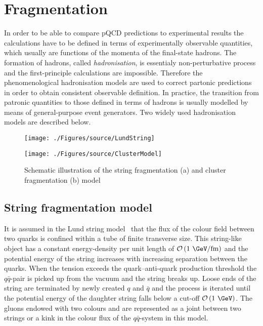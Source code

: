 \section{Fragmentation}
\label{sec:fragmentation}
In order to be able to compare pQCD predictions to experimental results the calculations have to be defined in terms of experimentally observable quantities, which usually are functions of the momenta of the final-state hadrons. The formation of hadrons, called \emph{hadronisation}, is essentialy non-perturbative process and the first-principle calculations are impossible. Therefore the phenomenological hadronisation models are used to correct partonic predictions in order to obtain consistent observable definition. In practice, the transition from patronic quantities to those defined in terms of hadrons is usually modelled by means of general-purpose event generators. Two widely used hadronisation models are described below.
\begin{figure}[t]
	\centering
	\begin{subfloat}[]{
		\texttt{[image: ./Figures/source/LundString]}
		\label{fig:lund}
	 }%
	\end{subfloat}
	\begin{subfloat}[]{
		\texttt{[image: ./Figures/source/ClusterModel]}
		\label{fig:cluster}
	}%
	\end{subfloat}
	\caption{Schematic illustration of the string fragmentation (a) and cluster fragmentation (b) model}
\label{fig:fragmentationmodels}
\end{figure}
\subsection{String fragmentation model}
It is assumed in the Lund string model~\cite{lundmodel} that the flux of the colour field between two quarks is confined within a tube of finite transverse size. This string-like object has a constant energy-density per unit length of $\mathcal{O}\left( \text{1 \GeV/fm}\right)$ and the potential energy of the string increases with increasing separation between the quarks. When the tension exceeds the quark--anti-quark production threshold the $q\bar{q}$-pair is picked up from the vacuum and the string breaks up. Loose ends of the string are terminated by newly created $q$ and $\bar{q}$ and the process is iterated until the potential energy of the daughter string falls below a cut-off $\mathcal{O}\left( \text{1 \GeV}\right)$. The gluons endowed with two colours and are represented as a joint between two strings or a kink in the colour flux of the $q\bar{q}$-system in this model. 

